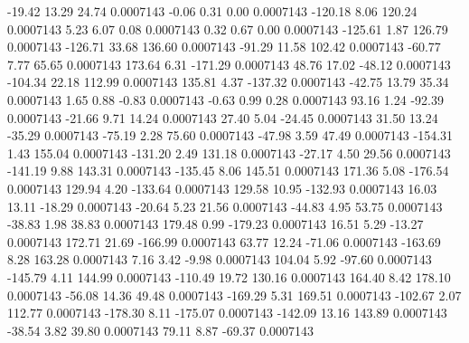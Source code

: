       -19.42       13.29       24.74     0.0007143
       -0.06        0.31        0.00     0.0007143
     -120.18        8.06      120.24     0.0007143
        5.23        6.07        0.08     0.0007143
        0.32        0.67        0.00     0.0007143
     -125.61        1.87      126.79     0.0007143
     -126.71       33.68      136.60     0.0007143
      -91.29       11.58      102.42     0.0007143
      -60.77        7.77       65.65     0.0007143
      173.64        6.31     -171.29     0.0007143
       48.76       17.02      -48.12     0.0007143
     -104.34       22.18      112.99     0.0007143
      135.81        4.37     -137.32     0.0007143
      -42.75       13.79       35.34     0.0007143
        1.65        0.88       -0.83     0.0007143
       -0.63        0.99        0.28     0.0007143
       93.16        1.24      -92.39     0.0007143
      -21.66        9.71       14.24     0.0007143
       27.40        5.04      -24.45     0.0007143
       31.50       13.24      -35.29     0.0007143
      -75.19        2.28       75.60     0.0007143
      -47.98        3.59       47.49     0.0007143
     -154.31        1.43      155.04     0.0007143
     -131.20        2.49      131.18     0.0007143
      -27.17        4.50       29.56     0.0007143
     -141.19        9.88      143.31     0.0007143
     -135.45        8.06      145.51     0.0007143
      171.36        5.08     -176.54     0.0007143
      129.94        4.20     -133.64     0.0007143
      129.58       10.95     -132.93     0.0007143
       16.03       13.11      -18.29     0.0007143
      -20.64        5.23       21.56     0.0007143
      -44.83        4.95       53.75     0.0007143
      -38.83        1.98       38.83     0.0007143
      179.48        0.99     -179.23     0.0007143
       16.51        5.29      -13.27     0.0007143
      172.71       21.69     -166.99     0.0007143
       63.77       12.24      -71.06     0.0007143
     -163.69        8.28      163.28     0.0007143
        7.16        3.42       -9.98     0.0007143
      104.04        5.92      -97.60     0.0007143
     -145.79        4.11      144.99     0.0007143
     -110.49       19.72      130.16     0.0007143
      164.40        8.42      178.10     0.0007143
      -56.08       14.36       49.48     0.0007143
     -169.29        5.31      169.51     0.0007143
     -102.67        2.07      112.77     0.0007143
     -178.30        8.11     -175.07     0.0007143
     -142.09       13.16      143.89     0.0007143
      -38.54        3.82       39.80     0.0007143
       79.11        8.87      -69.37     0.0007143

